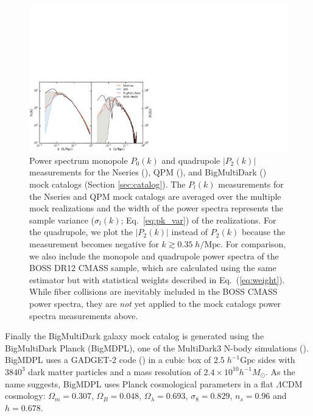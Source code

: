 \begin{figure}
\begin{center}
\includegraphics[width=1.\textwidth]{figs/fc/mock_catalog_Plk.pdf} 
\caption{
Power spectrum monopole $P_0(k)$ and 
quadrupole $|P_2(k)|$ measurements for the Nseries (\nseriescolor), 
QPM (\qpmcolor), and BigMultiDark (\bmdcolor) mock catalogs 
(Section \ref{sec:catalog}). The $P_l(k)$ measurements 
for the Nseries and QPM mock catalogs are averaged over the
multiple mock realizations and the width of the power spectra represents 
the sample variance ($\sigma_l(k)$; Eq.~\ref{eq:pk_var}) of the realizations. 
For the quadrupole, we plot the $|{P_2(k)}|$ instead of 
${P_2(k)}$ because the measurement becomes negative for 
$k \gtrsim 0.35\;h/\mathrm{Mpc}$. For comparison, we also include the monopole and 
quadrupole power spectra of the BOSS DR12 CMASS sample, which are calculated 
using the same estimator but with statistical weights described in Eq.~(\ref{eq:weight}). 
While fiber collisions are inevitably included in the BOSS CMASS power spectra, 
they are {\it not} yet applied to the mock catalogs power spectra measurements above. } 
\label{fig:mockpk}
\end{center}
\end{figure}

Finally the BigMultiDark galaxy mock catalog is generated using the 
BigMultiDark Planck (BigMDPL), one of the MultiDark3 N-body simulations 
(\citealt{Klypin:2014aa}). BigMDPL uses a GADGET-2 code (\citealt{Springel:2005ab})
in a cubic box of $2.5\;h^{-1}\mathrm{Gpc}$ sides with $3840^3$ dark matter 
particles and a mass resolution of $2.4\times 10^{10} h^{-1}M_\odot$. 
As the name suggests, BigMDPL uses Planck cosmological parameters in a flat $\Lambda$CDM cosmology: 
$\Omega_m = 0.307$, $\Omega_B = 0.048$, $\Omega_\lambda = 0.693$, $\sigma_8 = 0.829$, 
$n_s = 0.96$ and $h = 0.678$. 

